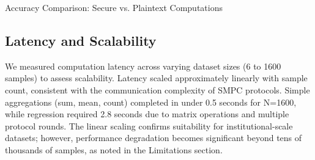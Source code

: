 \documentclass[conference]{IEEEtran}
\begin{document}
\begin{table}[H]
\centering
\caption{Accuracy Comparison: Secure vs. Plaintext Computations}
\label{tab:accuracy}
\vspace{0.4em}
\vspace{0.2em}
\captionsetup{justification=justified,font=footnotesize}
\caption*{\textit{Note:} MAE denotes Mean Absolute Error between secure and plaintext outputs; N indicates sample size range. All measurements averaged over 10 independent runs.}
\end{table}

\subsection{Latency and Scalability}
We measured computation latency across varying dataset sizes (6 to 1600 samples) to assess scalability. Latency scaled approximately linearly with sample count, consistent with the communication complexity of SMPC protocols. Simple aggregations (sum, mean, count) completed in under 0.5 seconds for N=1600, while regression required 2.8 seconds due to matrix operations and multiple protocol rounds. The linear scaling confirms suitability for institutional-scale datasets; however, performance degradation becomes significant beyond tens of thousands of samples, as noted in the Limitations section.
\end{document}

